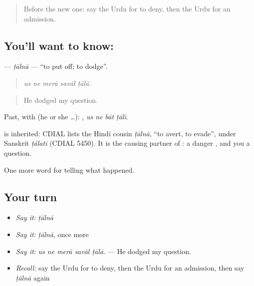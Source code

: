 \label{lesson:UR-C303-ttaalna}



\begin{quote}
Before the new one: say the Urdu for to deny, then the Urdu for an admission.
\end{quote}

\subsection*{You'll want to know: }
\textbf{} — \emph{ṭālnā} — \textquotedblleft{}to put off; to dodge\textquotedblright{}.

\begin{quote}
    
\end{quote}

\begin{quote}
\emph{us ne merā savāl ṭālā.}
\end{quote}

\begin{quote}
He dodged my question.
\end{quote}

Past, with  (he or she …):    , \emph{us ne bāt ṭālī}.

\begin{cousinweb}
is inherited: CDIAL lists the Hindi cousin \emph{ṭālnā}, \textquotedblleft{}to avert, to evade\textquotedblright{}, under Sanskrit \emph{ṭálati} (CDIAL 5450). It is the causing partner of \textbf{}: a danger \textbf{}, and you \textbf{} a question.
\end{cousinweb}

\begin{grammarlens}[title={What you've built}]
One more word for telling what happened.
\end{grammarlens}

\subsection*{Your turn}
\begin{itemize}
\raggedright
  \item \emph{Say it:} \emph{ṭālnā}
  \item \emph{Say it:} \emph{ṭālnā}, once more
  \item \emph{Say it:} \emph{us ne merā savāl ṭālā.} — He dodged my question.
  \item \emph{Recall:} say the Urdu for to deny, then the Urdu for an admission, then say \emph{ṭālnā} again
\end{itemize}

